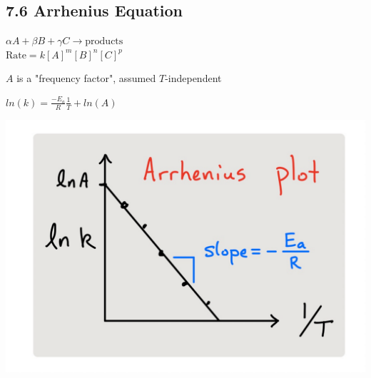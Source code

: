 \subsection{7.6 Arrhenius Equation}
    \vspace*{0.5em}
    $\alpha A + \beta B + \gamma C \longrightarrow \text{products}$\\
    $\text{Rate} = k[A]^m [B]^n [C]^p$


    $A$ is a "frequency factor", assumed $T$-independent
    \vspace*{0.5em}

    \begin{minipage}{0.99\linewidth}
        \begin{minipage}{0.49\linewidth}
            \centerline{$ln(k) = \frac{-E_a}{R} \frac{1}{T} + ln(A)$}
        \end{minipage}
        \begin{minipage}{0.49\linewidth}
            \centerline{\includegraphics[width=0.8\linewidth]{src/7_Kinetics/images/arrhenius_plot.pdf}}
        \end{minipage}
    \end{minipage}
    
    \vspace*{0.5em}